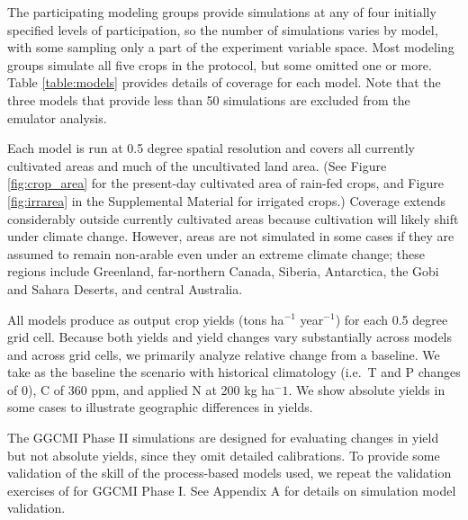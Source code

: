 \documentclass[esd, final]{copernicus} %
\begin{document}
The participating modeling groups provide simulations at any of four initially specified levels of participation, so the number of simulations varies by model, with some sampling only a part of the experiment variable space. Most modeling groups simulate all five crops in the protocol, but some omitted one or more. Table \ref{table:models} provides details of coverage for each model. Note that the three models that provide less than 50 simulations are excluded from the emulator analysis. 

Each model is run at 0.5 degree spatial resolution and covers all currently cultivated areas and much of the uncultivated land area. (See Figure \ref{fig:crop_area} for the present-day cultivated area of rain-fed crops, and Figure \ref{fig:irrarea} in the Supplemental Material for irrigated crops.)  Coverage extends considerably outside currently cultivated areas because cultivation will likely shift under climate change.  However, areas are not simulated in some cases if they are assumed to remain non-arable even under an extreme climate change; these regions include Greenland, far-northern Canada, Siberia, Antarctica, the Gobi and Sahara Deserts, and central Australia.  

All models produce as output crop yields (tons ha$^{-1}$ year$^{-1}$) for each 0.5 degree grid cell. Because both yields and yield changes vary substantially across models and across grid cells, we primarily analyze relative change from a baseline. We take as the baseline the scenario with historical climatology (i.e.\ T and P changes of 0), C of 360 ppm, and applied N at 200 kg ha$^-1$. We show absolute yields in some cases to illustrate geographic differences in yields.

The GGCMI Phase II simulations are designed for evaluating changes in yield but not absolute yields, since they omit detailed calibrations.
To provide some validation of the skill of the process-based models used, we repeat the validation exercises of \citet{muller_global_2017} for GGCMI Phase I. See Appendix A for details on simulation model validation.

\end{document}
